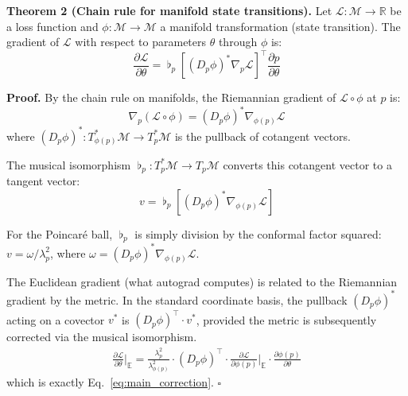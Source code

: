 \documentclass[a4paper,fleqn]{cas-dc}
\newcommand{\mflat}{\mathbin{\flat}}
\begin{document}
\textbf{Theorem 2 (Chain rule for manifold state transitions).} Let $\mathcal{L}: \mathcal{M} \to \mathbb{R}$ be a loss function and $\phi: \mathcal{M} \to \mathcal{M}$ a manifold transformation (state transition). The gradient of $\mathcal{L}$ with respect to parameters $\theta$ through $\phi$ is:
\begin{equation}
\frac{\partial\mathcal{L}}{\partial\theta} = \mflat_{p}\left[(D_p\phi)^* \nabla_{p}\mathcal{L}\right]^\top \frac{\partial p}{\partial\theta}
\end{equation}

\textbf{Proof.} By the chain rule on manifolds, the Riemannian gradient of $\mathcal{L} \circ \phi$ at $p$ is:
\begin{equation}
\nabla_p(\mathcal{L} \circ \phi) = (D_p\phi)^* \nabla_{\phi(p)}\mathcal{L}
\end{equation}
where $(D_p\phi)^*: T^*_{\phi(p)}\mathcal{M} \to T^*_p\mathcal{M}$ is the pullback of cotangent vectors.

The musical isomorphism $\mflat_p: T^*_p\mathcal{M} \to T_p\mathcal{M}$ converts this cotangent vector to a tangent vector:
\begin{equation}
v = \mflat_p\left[(D_p\phi)^* \nabla_{\phi(p)}\mathcal{L}\right]
\end{equation}

For the Poincar\'e ball, $\mflat_p$ is simply division by the conformal factor squared: $v = \omega / \lambda_p^2$, where $\omega = (D_p\phi)^* \nabla_{\phi(p)}\mathcal{L}$.

The Euclidean gradient (what autograd computes) is related to the Riemannian gradient by the metric. In the standard coordinate basis, the pullback $(D_p\phi)^*$ acting on a covector $v^*$ is $(D_p\phi)^\top \cdot v^*$, provided the metric is subsequently corrected via the musical isomorphism.
\begin{multline}
\frac{\partial\mathcal{L}}{\partial\theta}\bigg|_{\mathbb{E}}
 = \frac{\lambda_p^2}{\lambda_{\phi(p)}^2} \cdot
   (D_p\phi)^\top \cdot
   \frac{\partial\mathcal{L}}{\partial\phi(p)}\bigg|_{\mathbb{E}} \cdot
   \frac{\partial\phi(p)}{\partial\theta}
\end{multline}
which is exactly Eq.~\eqref{eq:main_correction}. $\square$
\end{document}

